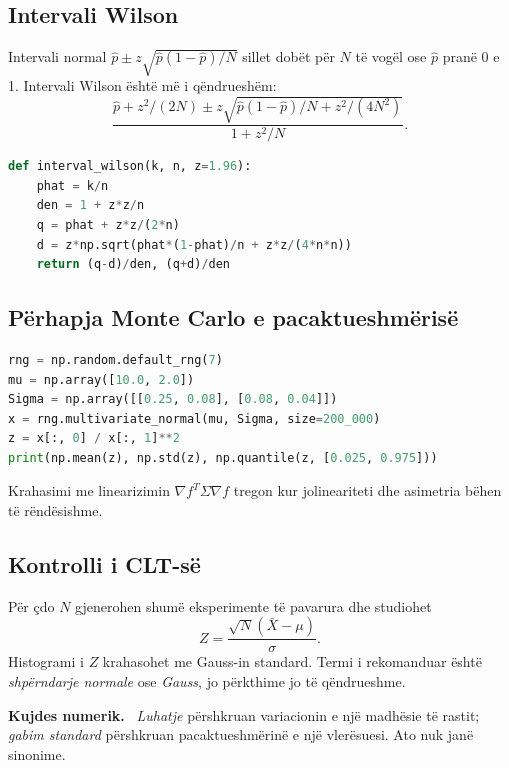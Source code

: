 \documentclass[11pt,oneside,openany]{book}
\newenvironment{kujdes}{\par\medskip\noindent\textbf{Kujdes numerik.}\ }{\par\medskip}
\begin{document}
\subsection{Intervali Wilson}
Intervali normal $\hat p\pm z\sqrt{\hat p(1-\hat p)/N}$ sillet dobët për $N$ të vogël ose $\hat p$ pranë 0 e 1. Intervali Wilson është më i qëndrueshëm:
\begin{equation}
 \frac{\hat p+z^2/(2N)\pm z\sqrt{\hat p(1-\hat p)/N+z^2/(4N^2)}}{1+z^2/N}.
\end{equation}

\begin{lstlisting}[language=Python]
def interval_wilson(k, n, z=1.96):
    phat = k/n
    den = 1 + z*z/n
    q = phat + z*z/(2*n)
    d = z*np.sqrt(phat*(1-phat)/n + z*z/(4*n*n))
    return (q-d)/den, (q+d)/den
\end{lstlisting}

\subsection{Përhapja Monte Carlo e pacaktueshmërisë}
\begin{lstlisting}[language=Python,caption={Përhapja e hyrjeve të korreluara.}]
rng = np.random.default_rng(7)
mu = np.array([10.0, 2.0])
Sigma = np.array([[0.25, 0.08], [0.08, 0.04]])
x = rng.multivariate_normal(mu, Sigma, size=200_000)
z = x[:, 0] / x[:, 1]**2
print(np.mean(z), np.std(z), np.quantile(z, [0.025, 0.975]))
\end{lstlisting}
Krahasimi me linearizimin $\nabla f^T\Sigma\nabla f$ tregon kur jolineariteti dhe asimetria bëhen të rëndësishme.

\subsection{Kontrolli i CLT-së}
Për çdo $N$ gjenerohen shumë eksperimente të pavarura dhe studiohet
\begin{equation}
 Z=\frac{\sqrt N(\bar X-\mu)}{\sigma}.
\end{equation}
Histogrami i $Z$ krahasohet me Gauss-in standard. Termi i rekomanduar është \emph{shpërndarje normale} ose \emph{Gauss}, jo përkthime jo të qëndrueshme.

\begin{kujdes}
\emph{Luhatje} përshkruan variacionin e një madhësie të rastit; \emph{gabim standard} përshkruan pacaktueshmërinë e një vlerësuesi. Ato nuk janë sinonime.
\end{kujdes}
\end{document}
